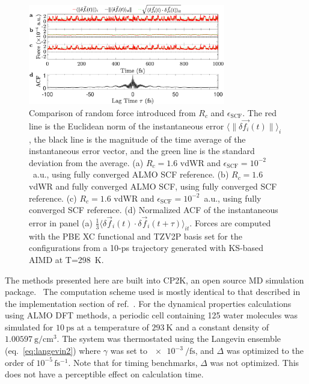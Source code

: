 \documentclass[aps,prl,reprint,amsmath,amssymb]{revtex4-1}
\begin{document}
\begin{figure}
\includegraphics[trim={0.5cm 0cm 0.7cm 0.1cm},clip,width=8.6cm]{DeltaForceComparison_with_ACF.eps}
\caption{\label{fig:randomforce} Comparison of random force introduced from $R_{c}$ and $\epsilon_{\text{SCF}}$. 
The red line is the Euclidean norm of the instantaneous error $\langle \| \delta \vec{f_{i}}(t) \| \rangle_{i}$, the black line is the magnitude of the time average of the instantaneous error vector, and the green line is the standard deviation from the average. 
(a) $R_{c} = 1.6$ vdWR and $\epsilon_{\text{SCF}} = 10^{-2}$~a.u., using fully converged ALMO SCF reference.
(b) $R_{c} = 1.6$ vdWR and fully converged ALMO SCF, using fully converged SCF reference.
(c) $R_{c} = 1.6$ vdWR and $\epsilon_{\text{SCF}} = 10^{-2}$~a.u., using fully converged SCF reference.
(d) Normalized ACF of the instantaneous error in panel (a) $\frac{1}{3}\langle \delta \vec{f}_i (t) \cdot \delta\vec{f}_i(t+\tau) \rangle_{it} $.
Forces are computed with the PBE XC functional and TZV2P basis set for the configurations from a 10-ps trajectory generated with KS-based AIMD at T=298~K. 
}
\end{figure}


The methods presented here are built into CP2K, an open source MD simulation package.~\cite{www:cp2k} 
The computation scheme used is mostly identical to that described in the implementation section of ref.\ . 
For the dynamical properties calculations using ALMO DFT methods, a periodic cell containing 125 water molecules was simulated for $\SI{10}{\ps}$ at a temperature of $\SI{293}{\K}$ and a constant density of $\SI{1.00597}{\g\per\cm^{3}}$. 
The system was thermostated using the Langevin ensemble (eq.\ \ref{eq:langevin2}) where $\gamma$ was set to $\SI{e-3}{\per\fs}$, and $\Delta$ was optimized to the order of $10^{-5}\, \mathrm{fs^{-1}}$. 
Note that for timing benchmarks, $\Delta$ was not optimized. 
This does not have a perceptible effect on calculation time.
\end{document}
